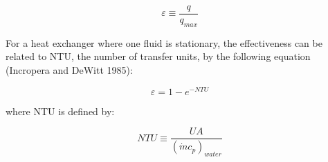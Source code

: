 \begin{equation}
\varepsilon  \equiv \frac{q}{{{q_{max }}}}
\label{eq:RadSysHX675}
\end{equation}

For a heat exchanger where one fluid is stationary, the effectiveness can be related to NTU, the number of transfer units, by the following equation (Incropera and DeWitt 1985):

\begin{equation}
\varepsilon  = 1 - {e^{ - NTU}}
\end{equation}

where NTU is defined by:

\begin{equation}
NTU \equiv \frac{{UA}}{{{{\left( {\dot m{c_p}} \right)}_{water}}}}
\label{eq:NTURadSysEquationGeneric}
\end{equation}

